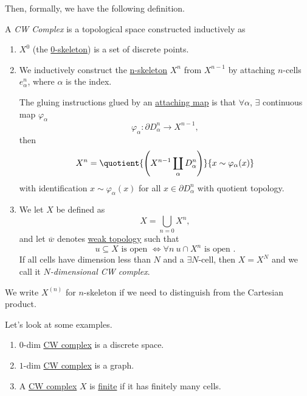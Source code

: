 Then, formally, we have the following definition.
\begin{definition}[CW Complex]\label{def:CW-Complex}
	A \emph{CW Complex} is a topological space constructed inductively as
	\begin{enumerate}
		\item \(X^0\) (the \underline{0-skeleton}) is a set of discrete points.
		\item We inductively construct the \underline{n-skeleton} \(X^n\) from \(X^{n-1}\) by attaching \(n\)-cells \(e^n_{\alpha}\), where
		      \(\alpha\) is the index.
		      \par The gluing instructions glued by an \underline{attaching map} is that \(\forall \alpha\), \(\exists \) continuous map \(\varphi_{\alpha}\)
		      \[
			      \varphi_{\alpha}\colon \partial D^n_{\alpha}\to X^{n-1},
		      \]
		      then
		      \[
			      X^n = \quotient{\left(X^{n-1}\coprod\limits_{\alpha}D^n_\alpha\right)}{x\sim \varphi_{\alpha}(x)}
		      \]
		      with identification \(x\sim \varphi_{\alpha}(x)\) for all \(x\in \partial D^n_{\alpha}\) with quotient topology.
		\item We let \(X\) be defined as
		      \[
			      X = \bigcup\limits_{n=0} X^n,
		      \]
		      and let \(\overline{w} \) denotes \underline{weak topology} such that
		      \[
			      u\subseteq X \text{ is open }\iff \forall n\ u\cap X^n \text{ is open }.
		      \]
		      If all cells have dimension less than \(N\) and a \(\exists N\)-cell, then \(X = X^N\) and we call it \emph{\(N\)-dimensional CW complex}.
	\end{enumerate}
\end{definition}
\begin{remark}
	We write \(X^{(n)}\) for \(n\)-skeleton if we need to distinguish from the Cartesian product.
\end{remark}

\begin{eg}
	Let's look at some examples.
	\begin{enumerate}
		\item \(0\)-dim \hyperref[def:CW-Complex]{CW complex} is a discrete space.
		\item \(1\)-dim \hyperref[def:CW-Complex]{CW complex} is a graph.
		\item A \hyperref[def:CW-Complex]{CW complex} \(X\) is \underline{finite} if it has finitely many cells.
	\end{enumerate}
\end{eg}


